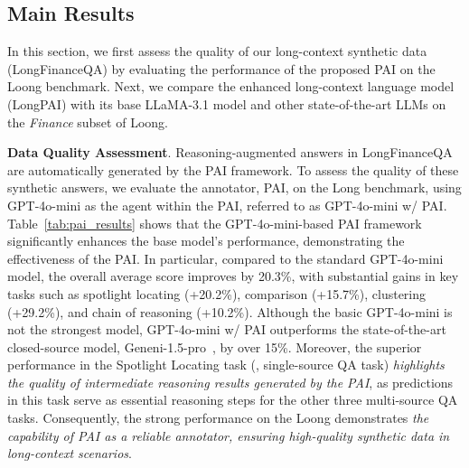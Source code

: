 \subsection{Main Results}\vspace{-2mm}
In this section, we first assess the quality of our long-context synthetic data (LongFinanceQA) by evaluating the performance of the proposed PAI on the Loong benchmark. Next, we compare the enhanced long-context language model (LongPAI) with its base LLaMA-3.1 model and other state-of-the-art LLMs on the \textit{Finance} subset of Loong.

\noindent \textbf{Data Quality Assessment}.
Reasoning-augmented answers in LongFinanceQA are automatically generated by the PAI framework. To assess the quality of these synthetic answers, we evaluate the annotator, PAI, on the Long benchmark, using GPT-4o-mini as the agent within the PAI, referred to as GPT-4o-mini w/ PAI.
Table~\ref{tab:pai_results} shows that the GPT-4o-mini-based PAI framework significantly enhances the base model’s performance, demonstrating the effectiveness of the PAI.
In particular, compared to the standard GPT-4o-mini model, the overall average score improves by 20.3\%, with substantial gains in key tasks such as spotlight locating (+20.2\%), comparison (+15.7\%), clustering (+29.2\%), and chain of reasoning (+10.2\%).
Although the basic GPT-4o-mini is not the strongest model, GPT-4o-mini w/ PAI outperforms the state-of-the-art closed-source model, Geneni-1.5-pro~\cite{reid2024gemini}, by over 15\%. 
Moreover, the superior performance in the Spotlight Locating task (\ie, single-source QA task) \textit{highlights the quality of intermediate reasoning results generated by the PAI}, as predictions in this task serve as essential reasoning steps for the other three multi-source QA tasks.
Consequently, the strong performance on the Loong demonstrates \textit{the capability of PAI as a reliable annotator, ensuring high-quality synthetic data in long-context scenarios}.


